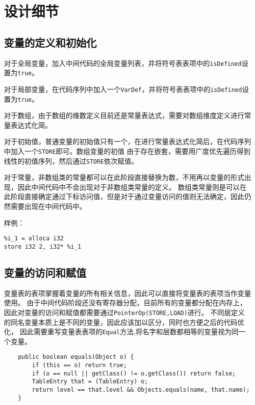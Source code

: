 \section{设计细节}

\subsection{变量的定义和初始化}

对于全局变量，加入中间代码的全局变量列表，并将符号表表项中的\texttt{isDefined}设置为\texttt{true}。

对于局部变量，在代码序列中加入一个\texttt{VarDef}，并将符号表表项中的\texttt{isDefined}设置为\texttt{true}。

对于数组，由于数组的维数定义目前还是常量表达式，需要对数组维度定义进行常量表达式化简。

对于初始值，普通变量的初始值只有一个，在进行常量表达式化简后，在代码序列中加入一个\texttt{STORE}即可。数组变量的初值
由于存在嵌套，需要用广度优先遍历得到线性的初值序列，然后通过\texttt{STORE}依次赋值。

对于常量，非数组类的常量都可以在此阶段直接替换为数，不用再以变量的形式出现，因此中间代码中不会出现对于非数组类常量的定义。
数组类常量则是可以在此阶段直接确定通过下标访问值，但是对于通过变量访问的值则无法确定，因此仍然需要出现在中间代码中。

样例：
\begin{verbatim}
%i_1 = alloca i32
store i32 2, i32* %i_1
\end{verbatim}

\subsection{变量的访问和赋值}
变量表的表项掌握着变量的所有相关信息，因此可以直接将变量表的表项当作变量使用。
由于中间代码阶段还没有寄存器分配，目前所有的变量都分配在内存上，因此对变量的访问和赋值都需要通过\texttt{PointerOp(STORE,LOAD)}进行。
不同层定义的同名变量本质上是不同的变量，因此应该加以区分，同时也方便之后的代码优化，
因此需要重写变量表表项的\texttt{Equal}方法,将名字和层数都相等的变量视为同一个变量。

\begin{verbatim}
    public boolean equals(Object o) {
        if (this == o) return true;
        if (o == null || getClass() != o.getClass()) return false;
        TableEntry that = (TableEntry) o;
        return level == that.level && Objects.equals(name, that.name);
    }
\end{verbatim}

